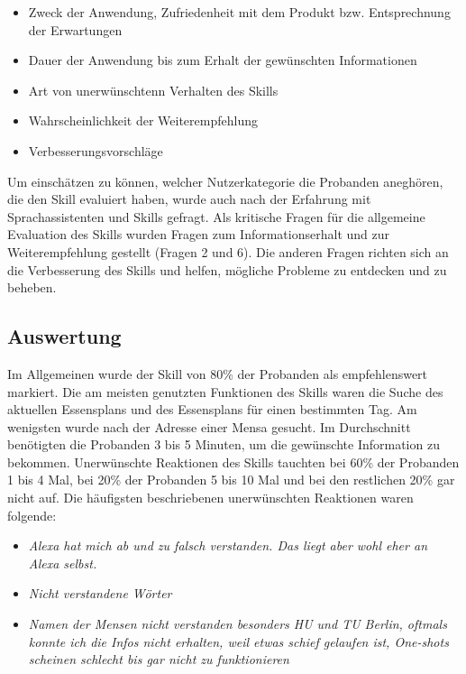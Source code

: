 \documentclass[12pt]{article}
\begin{document}
\begin{itemize}
\setlength\itemsep{0em}
  \item Zweck der Anwendung, Zufriedenheit mit dem Produkt bzw. Entsprechnung der Erwartungen
  \item Dauer der Anwendung bis zum Erhalt der gewünschten Informationen
  \item Art von unerwünschtenn Verhalten des Skills
  \item Wahrscheinlichkeit der Weiterempfehlung
  \item Verbesserungsvorschläge
\end{itemize}

Um einschätzen zu können, welcher Nutzerkategorie die Probanden aneghören, die den Skill evaluiert haben, wurde auch nach der Erfahrung mit Sprachassistenten und Skills gefragt.
Als kritische Fragen für die allgemeine Evaluation des Skills wurden Fragen zum Informationserhalt und zur Weiterempfehlung gestellt (Fragen 2 und 6). 
Die anderen Fragen richten sich an die Verbesserung des Skills und helfen, mögliche Probleme zu entdecken und zu beheben.

\subsection{Auswertung}
Im Allgemeinen wurde der Skill von 80\% der Probanden als empfehlenswert markiert. 
Die am meisten genutzten Funktionen des Skills waren die Suche des aktuellen Essensplans und des Essensplans für einen bestimmten Tag.
Am wenigsten wurde nach der Adresse einer Mensa gesucht.
Im Durchschnitt benötigten die Probanden 3 bis 5 Minuten, um die gewünschte Information zu bekommen.
Unerwünschte Reaktionen des Skills tauchten bei 60\% der Probanden 1 bis 4 Mal, bei 20\% der Probanden 5 bis 10 Mal und bei den restlichen 20\% gar nicht auf. Die häufigsten beschriebenen unerwünschten Reaktionen waren folgende:
\begin{itemize}
\setlength\itemsep{0em}
  \item \emph{Alexa hat mich ab und zu falsch verstanden. Das liegt aber wohl eher an Alexa selbst.}
  \item \emph{Nicht verstandene Wörter}
  \item \emph{Namen der Mensen nicht verstanden besonders HU und TU Berlin, oftmals konnte ich die Infos nicht erhalten, weil etwas schief gelaufen ist, One-shots scheinen schlecht bis gar nicht zu funktionieren}
\end{itemize}
\end{document}

